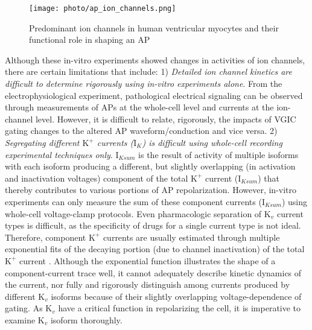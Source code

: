 \documentclass[journal]{IEEEtran}
\begin{document}
\begin{figure}
    \label{fig2}
    \centering
    \texttt{[image: photo/ap\_ion\_channels.png]}
    \caption{Predominant ion channels in human ventricular myocytes and their functional role in shaping an AP}
    \label{fig:my_label}
\end{figure}

Although these in-vitro experiments showed changes in activities of ion channels, there are certain limitations that include: 1) \textit{Detailed ion channel kinetics are difficult to determine rigorously using in-vitro experiments alone}. From the electrophysiological experiment, pathological electrical signaling can be observed through measurements of APs at the whole-cell level and currents at the ion-channel level. However, it is difficult to relate, rigorously, the impacts of VGIC gating changes to the altered AP waveform/conduction and vice versa. 2) \textit{Segregating different $\text{K}^{+}$ currents ($\text{I}_{K}$) is difficult using whole-cell recording experimental techniques only}. $\text{I}_{Ksum}$ is the result of activity of multiple isoforms with each isoform producing a different, but slightly overlapping (in activation and inactivation voltages) component of the total $\text{K}^{+}$ current ($\text{I}_{Ksum}$) \cite{brouillette2004functional} that thereby contributes to various portions of AP repolarization. However, in-vitro experiments can only measure the sum of these component currents ($\text{I}_{Ksum}$) using whole-cell voltage-clamp protocols. Even pharmacologic separation of $\text{K}_{v}$ current types is difficult, as the specificity of drugs for a single current type is not ideal. Therefore, component $\text{K}^{+}$ currents are usually estimated through multiple exponential fits of the decaying portion (due to channel inactivation) of the total $\text{K}^{+}$ current \cite{brunet2004heterogeneous}. Although the exponential function illustrates the shape of a component-current trace well, it cannot adequately describe kinetic dynamics of the current, nor fully and rigorously distinguish among currents produced by different $\text{K}_{v}$ isoforms because of their slightly overlapping voltage-dependence of gating. As $\text{K}_{v}$ have a critical function in repolarizing the cell, it is imperative to examine $\text{K}_{v}$ isoform thoroughly.
\end{document}
